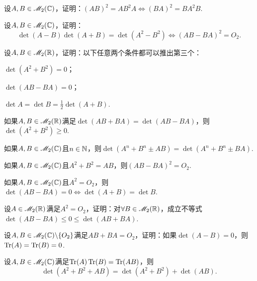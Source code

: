 \begin{problem}
  设$A,B\in\mathscr M_2(\mathbb C)$，证明：$(AB)^2=AB^2A\Leftrightarrow (BA)^2=BA^2B$.
\end{problem}

\begin{problem}
  设$A,B\in\mathscr M_2(\mathbb C)$，证明：
  \[
    \det(A - B) \det (A + B) = \det (A^2 - B^2) \Leftrightarrow (AB - BA)^2 = O_2.
  \]
\end{problem}

\begin{problem}
  设$A,B\in\mathscr M_2(\mathbb R)$，证明：以下任意两个条件都可以推出第三个：
  \begin{enum}
    \item $\det(A^2 + B^2)=0$；
    \item $\det(AB - BA)=0$；
    \item $\det A = \det B = \frac12\det(A+B)$.
  \end{enum}
\end{problem}

\begin{problem}
  如果$A,B\in\mathscr M_2(\mathbb R)$满足$\det(AB+BA)=\det(AB-BA)$，则$\det(A^2+B^2)\ge0$.
\end{problem}

\begin{problem}
  如果$A,B\in\mathscr M_2(\mathbb C)$且$n\in\mathbb N$，则$\det(A^n+B^n\pm AB)=\det(A^n+B^n\pm BA)$.
\end{problem}

\begin{problem}
  如果$A,B\in\mathscr M_2(\mathbb C)$且$A^2+B^2=AB$，则$(AB-BA)^2=O_2$.
\end{problem}

\begin{problem}
  如果$A,B\in\mathscr M_2(\mathbb C)$且$A^2=O_2$，则
  $\det(AB-BA)=0\Leftrightarrow \det(A+B)=\det B$.
\end{problem}

\begin{problem}
  设$A\in\mathscr M_2(\mathbb R)$满足$A^2=O_2$，证明：对$\forall B\in\mathscr M_2(\mathbb R)$，成立不等式$\det(AB-BA)\le0\le\det(AB+BA)$.
\end{problem}

\begin{problem}
  设$A,B\in\mathscr M_2(\mathbb C)\backslash\{O_2\}$满足$AB+BA=O_2$，证明：如果$\det(A-B)=0$，则$\operatorname{Tr}(A)=\operatorname{Tr}(B)=0$.
\end{problem}

\begin{problem}
  设$A,B\in\mathscr M_2(\mathbb C)$满足$\operatorname{Tr}(A)\operatorname{Tr}(B)=\operatorname{Tr}(AB)$，则
  \[
    \det(A^2 + B^2 + AB) = \det(A^2 + B^2) + \det (AB).
  \]
\end{problem}

